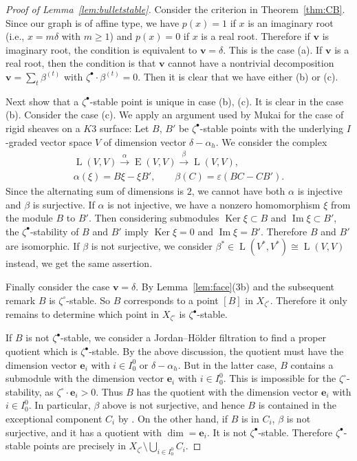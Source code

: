 \documentclass[pdftex]{sigma}
\theoremstyle{definition}
\numberwithin{equation}{section}
\newcommand{\thmref}[1]{Theorem~\ref{#1}}
\newcommand{\lemref}[1]{Lemma~\ref{#1}}
\newcommand{\Ker}{\operatorname{Ker}}
\newcommand{\Ima}{\operatorname{Im}}
\newcommand{\bv}{{\mathbf v}} %
\newcommand{\be}{{\mathbf e}}
\newcommand{\HomE}{\operatorname{E}}
\newcommand{\HomL}{\operatorname{L}}
\begin{document}
\begin{proof}[Proof of \lemref{lem:bulletstable}]
  Consider the criterion in \thmref{thm:CB}. Since our graph is of
  af\/f\/ine type, we have $p(x) = 1$ if $x$ is an imaginary root (i.e.,
  $x = m\delta$ with $m\ge 1$) and $p(x) = 0$ if $x$ is a real root.
  Therefore if $\bv$ is imaginary root, the condition is equivalent to
  $\bv = \delta$. This is the case (a). If $\bv$ is a real root, then
  the condition is that $\bv$ cannot have a nontrivial decomposition
  $\bv = \sum_t \beta^{(t)}$ with $\zeta^\bullet\cdot \beta^{(t)} = 0$. Then
  it is clear that we have either (b) or (c).


Next show that a $\zeta^\bullet$-stable point is unique in case (b),
(c). It is clear in the case (b). Consider the case (c). We apply an
argument used by Mukai for the case of rigid sheaves on a $K3$
surface:
%
Let $B$, $B'$ be $\zeta^\bullet$-stable points with the underlying
$I$-graded vector space $V$ of dimension vector $\delta-\alpha_h$. We
consider the complex
\begin{gather*}
  \HomL(V,V) \xrightarrow{\alpha} \HomE(V,V) \xrightarrow{\beta}
  \HomL(V,V),
\\
  \alpha(\xi) = B\xi - \xi B', \qquad
  \beta(C) = \varepsilon (B C - C B').
\end{gather*}
Since the alternating sum of dimensions is $2$, we cannot have both
$\alpha$ is injective and $\beta$ is surjective. If $\alpha$ is not
injective, we have a nonzero homomorphism $\xi$ from the module $B$ to
$B'$. Then considering submodules $\Ker\xi\subset B$ and
$\Ima\xi\subset B'$, the $\zeta^\bullet$-stability of $B$ and $B'$
imply $\Ker\xi = 0$ and $\Ima\xi = B'$. Therefore $B$ and $B'$ are
isomorphic. If $\beta$ is not surjective, we consider
$\beta^*\in \HomL(V^*,V^*) \cong \HomL(V,V)$ instead, we get the same
assertion.

Finally consider the case $\bv = \delta$.
%
By \lemref{lem:face}(3b) and the subsequent remark $B$ is
$\zeta^\circ$-stable. So $B$ corresponds to a point $[B]$ in
$X_{\zeta^\circ}$. Therefore it only remains to determine which point
in $X_{\zeta^\circ}$ is $\zeta^\bullet$-stable.

If $B$ is not $\zeta^\bullet$-stable, we consider a
Jordan--H\"older f\/iltration to f\/ind a proper quotient which is
$\zeta^\bullet$-stable. By the above discussion, the quotient must
have the dimension vector $\be_i$ with $i\in I_0^0$ or
$\delta-\alpha_h$. But in the latter case, $B$ contains a submodule
with the dimension vector $\be_i$ with $i\in I_0^0$. This is
impossible for the $\zeta^\circ$-stability, as $\zeta^\circ \cdot
\be_i > 0$.
%
Thus $B$ has the quotient with the dimension vector $\be_i$ with
$i\in I_0^0$. In particular, $\beta$ above is not surjective, and
hence $B$ is contained in the exceptional component $C_i$ by
\cite[Proof of 5.10]{Na-proc}.
%
On the other hand, if $B$ is in $C_i$, $\beta$ is not surjective,
and it has a quotient with $\dim = \be_i$. It is not
$\zeta^\bullet$-stable.
%
Therefore $\zeta^\bullet$-stable points are precisely in
$X_{\zeta^\circ}\setminus \bigcup_{i\in I_0^0} C_i$.
\end{proof}
\end{document}
